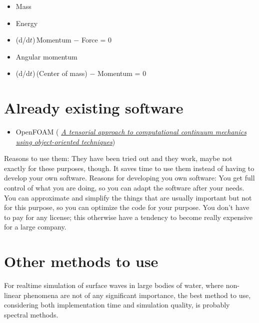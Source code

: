 \begin{itemize}
    \item Mass
    \item Energy
    \item (d/d$t$)\,Momentum $-$ Force = 0
    \item Angular momentum
    \item (d/d$t$)\,(Center of mass) $-$ Momentum = 0
\end{itemize}

\section{Already existing software}

\begin{itemize}
    \item OpenFOAM ( \textit{\href{http://powerlab.fsb.hr/ped/kturbo/openfoam/docs/foam.pdf}{A tensorial approach to computational continuum mechanics using object-oriented techniques}})
\end{itemize}

Reasons to use them: They have been tried out and they work, maybe not exactly for these purposes, though. It saves time to use them instead of having to develop your own software. Reasons for developing you own software: You get full control of what you are doing, so you can adapt the software after your needs. You can approximate and simplify the things that are usually important but not for this purpose, so you can optimize the code for your purpose. You don't have to pay for any license; this otherwise have a tendency to become really expensive for a large company.

\section{Other methods to use}

For realtime simulation of surface waves in large bodies of water, where non-linear phenomena are not of any significant importance, the best method to use, considering both implementation time and simulation quality, is probably spectral methods.
